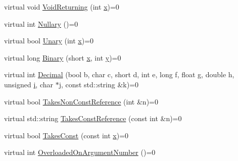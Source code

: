 \begin{DoxyCompactItemize}
\item 
virtual void \mbox{\hyperlink{classtesting_1_1gmock__function__mocker__test_1_1_foo_interface_ab62327ee683b362d9e5579266b74a09c}{Void\+Returning}} (int \mbox{\hyperlink{_obj__test_2lib_2googletest-master_2googlemock_2test_2gmock-matchers__test_8cc_a6150e0515f7202e2fb518f7206ed97dc}{x}})=0
\item 
virtual int \mbox{\hyperlink{classtesting_1_1gmock__function__mocker__test_1_1_foo_interface_a9440f75381e8a44977c2caee7914098f}{Nullary}} ()=0
\item 
virtual bool \mbox{\hyperlink{classtesting_1_1gmock__function__mocker__test_1_1_foo_interface_a6f28f91c92b59da029ed0cb61c3d1da6}{Unary}} (int \mbox{\hyperlink{_obj__test_2lib_2googletest-master_2googlemock_2test_2gmock-matchers__test_8cc_a6150e0515f7202e2fb518f7206ed97dc}{x}})=0
\item 
virtual long \mbox{\hyperlink{classtesting_1_1gmock__function__mocker__test_1_1_foo_interface_a8d6e54401a3addca464903257529ace4}{Binary}} (short \mbox{\hyperlink{_obj__test_2lib_2googletest-master_2googlemock_2test_2gmock-matchers__test_8cc_a6150e0515f7202e2fb518f7206ed97dc}{x}}, int \mbox{\hyperlink{_obj__test_2lib_2googletest-master_2googlemock_2test_2gmock-matchers__test_8cc_a39cb44155237f0205e0feb931d5acbed}{y}})=0
\item 
virtual int \mbox{\hyperlink{classtesting_1_1gmock__function__mocker__test_1_1_foo_interface_a2a415a61b9a9c7a69bba9a4b5ef2a63e}{Decimal}} (bool b, char c, short d, int e, long f, float g, double h, unsigned \mbox{\hyperlink{_obj__test_2lib_2googletest-master_2googlemock_2test_2gmock-matchers__test_8cc_acb559820d9ca11295b4500f179ef6392}{i}}, char $\ast$j, const std\+::string \&k)=0
\item 
virtual bool \mbox{\hyperlink{classtesting_1_1gmock__function__mocker__test_1_1_foo_interface_aaf21cef138ffa4a8f2372c7fbed95b18}{Takes\+Non\+Const\+Reference}} (int \&n)=0
\item 
virtual std\+::string \mbox{\hyperlink{classtesting_1_1gmock__function__mocker__test_1_1_foo_interface_a4765c543c11b5d544a35f9fe8de758bd}{Takes\+Const\+Reference}} (const int \&n)=0
\item 
virtual bool \mbox{\hyperlink{classtesting_1_1gmock__function__mocker__test_1_1_foo_interface_abb43737fd2eeb7599b6f0af540890f50}{Takes\+Const}} (const int \mbox{\hyperlink{_obj__test_2lib_2googletest-master_2googlemock_2test_2gmock-matchers__test_8cc_a6150e0515f7202e2fb518f7206ed97dc}{x}})=0
\item 
virtual int \mbox{\hyperlink{classtesting_1_1gmock__function__mocker__test_1_1_foo_interface_ae27d00da9698493b196d0913dd5b6c1a}{Overloaded\+On\+Argument\+Number}} ()=0

\end{DoxyCompactItemize}
